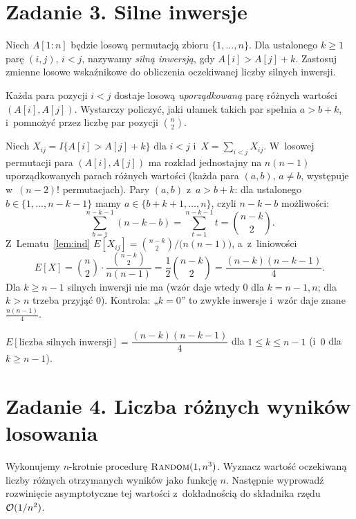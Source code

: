 \documentclass[11pt]{article}
\begin{document}
\section{Zadanie 3. Silne inwersje}
\begin{tresc}
Niech $A[1:n]$ będzie losową permutacją zbioru $\{1,\ldots,n\}$. Dla ustalonego
$k\ge1$ parę $(i,j)$, $i<j$, nazywamy \emph{silną inwersją}, gdy
$A[i]>A[j]+k$. Zastosuj zmienne losowe wskaźnikowe do obliczenia oczekiwanej
liczby silnych inwersji.
\end{tresc}

\begin{intuicja}
Każda para pozycji $i<j$ dostaje losową \emph{uporządkowaną} parę różnych
wartości $(A[i],A[j])$. Wystarczy policzyć, jaki ułamek takich par spełnia
$a>b+k$, i~pomnożyć przez liczbę par pozycji $\binom n2$.
\end{intuicja}
\formalnie
Niech $X_{ij}=I\{A[i]>A[j]+k\}$ dla $i<j$ i~$X=\sum_{i<j}X_{ij}$. W~losowej
permutacji para $(A[i],A[j])$ ma rozkład jednostajny na $n(n-1)$
uporządkowanych parach różnych wartości (każda para $(a,b)$, $a\ne b$,
występuje w~$(n-2)!$ permutacjach). Pary $(a,b)$ z~$a>b+k$: dla ustalonego
$b\in\{1,\dots,n-k-1\}$ mamy $a\in\{b+k+1,\dots,n\}$, czyli $n-k-b$ możliwości:
\[
\sum_{b=1}^{n-k-1}(n-k-b)=\sum_{t=1}^{n-k-1}t=\binom{n-k}{2}.
\]
Z~Lematu~\ref{lem:ind} $E[X_{ij}]=\binom{n-k}2\big/\bigl(n(n-1)\bigr)$, a~z~liniowości
\[
E[X]=\binom n2\cdot\frac{\binom{n-k}2}{n(n-1)}=\frac12\binom{n-k}{2}=\frac{(n-k)(n-k-1)}{4}.
\]
Dla $k\ge n-1$ silnych inwersji nie ma (wzór daje wtedy $0$ dla $k=n-1,n$; dla
$k>n$ trzeba przyjąć $0$). Kontrola: „$k=0$” to zwykłe inwersje i~wzór daje
znane $\frac{n(n-1)}{4}$.
\begin{odpowiedz}
$E[\text{liczba silnych inwersji}]=\dfrac{(n-k)(n-k-1)}{4}$ dla $1\le k\le n-1$ (i~$0$ dla $k\ge n-1$).
\end{odpowiedz}

\section{Zadanie 4. Liczba różnych wyników losowania}
\begin{tresc}
Wykonujemy $n$-krotnie procedurę $\textsc{Random}(1,n^3)$. Wyznacz wartość
oczekiwaną liczby różnych otrzymanych wyników jako funkcję $n$. Następnie
wyprowadź rozwinięcie asymptotyczne tej wartości z~dokładnością do składnika
rzędu $\mathcal{O}(1/n^2)$.
\end{tresc}
\end{document}
